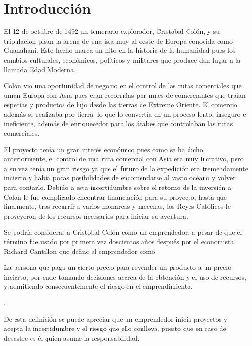 \chapter{Introducción}

El 12 de octubre de 1492 un temerario explorador, Cristobal Colón, y su tripulación pisan la arena de una isla muy al oeste de Europa conocida como Guanahani. Este hecho marca un hito en la historia de la humanidad pues los cambios culturales, económicos, políticos y militares que produce dan lugar a la llamada Edad Moderna.

Colón vio una oportunidad de negocio en el control de las rutas comerciales que unían Europa con Asia pues eran recorridas por miles de comerciantes que traían especias y productos de lujo desde las tierras de Extremo Oriente. El comercio además se realizaba por tierra, lo que lo convertía en un proceso lento, inseguro e ineficiente, además de enriquecedor para los árabes que controlaban las rutas comerciales.

El proyecto tenía un gran interés económico pues como se ha dicho anteriormente, el control de una ruta comercial con Asia era muy lucrativo, pero a su vez tenía un gran riesgo ya que el futuro de la expedición era tremendamente incierto y había pocas posibilidades de encomendarse al vasto océano y volver para contarlo. Debido a esta incertidumbre sobre el retorno de la inversión a Colón le fue complicado encontrar financiación para su proyecto, hasta que finalmente, tras recurrir a varios monarcas y mecenas,  los Reyes Católicos le proveyeron de los recursos necesarios para iniciar su aventura.

Se podría considerar a Cristobal Colón como un emprendedor, a pesar de que el término fue usado por primera vez doscientos años después por el economista Richard Cantillon que define al emprendedor como 

\begin{itquote}
	La persona que paga un cierto precio para revender un producto a un precio incierto, por ende tomando decisiones acerca de la obtención y el uso de recursos, y admitiendo consecuentemente el riesgo en el emprendimiento.
 	\begin{flushright}
 	\cite[pág 21]{ashokbhanudasnavale2013}.
 	\end{flushright}
\end{itquote}

De esta definición se puede apreciar que un emprendedor inicia proyectos y acepta la incertidumbre y el riesgo que ello conlleva, puesto que en caso de desastre es él quien asume la responsabilidad.

